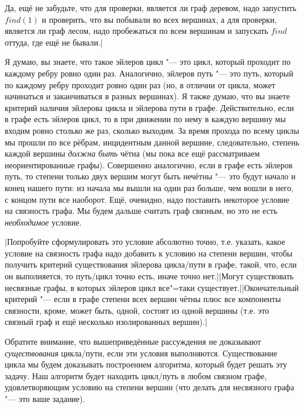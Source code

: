 Да, ещё не забудьте, что для проверки, является ли граф деревом, надо запустить $find(1)$ и проверить, что вы побывали
во всех вершинах, а для проверки, является ли граф лесом, надо пробежаться по всем вершинам и запускать $find$
оттуда, где ещё не бывали.|\label{checkiftree}

Я думаю, вы знаете, что такое эйлеров цикл "--- это цикл, который проходит по каждому ребру ровно 
один раз. Аналогично, эйлеров путь "--- это путь, который по каждому ребру проходит ровно один раз 
(но, в отличии от цикла, может начинаться и заканчиваться в разных вершинах). Я также думаю, что вы 
знаете критерий наличия эйлерова цикла и эйлерова пути в графе. Действительно, если в графе есть 
эйлеров цикл, то в при движении по нему в каждую вершину мы входим ровно столько же раз, сколько 
выходим. За время прохода по всему циклы мы прошли по все рёбрам, инцидентным данной вершине, 
следовательно, степень каждой вершины \textit{должна быть} чётна (мы пока все ещё рассматриваем 
неориентированные графы). Совершенно аналогично, если в графе есть эйлеров путь, то степени только 
двух вершим могут быть нечётны "--- это будут начало и конец нашего пути: из начала мы вышли на 
один раз больше, чем вошли в него, с концом пути все наоборот. Ещё, очевидно, надо поставить некоторое 
условие на связность графа. Мы будем дальше считать граф связным, но это не есть 
\textit{необходимое} условие.

\task|Попробуйте сформулировать это условие абсолютно точно, т.е. указать, какое условие на 
связность графа надо добавить к условию на степени вершин, чтобы получить критерий существования 
эйлерова цикла/пути в графе, такой, что, если он выполняется, то путь/цикл точно есть, иначе точно 
нет.||Могут существовать несвязные графы, в которых эйлеров цикл все"=таки существует.||Окончательный критерий "--- если 
в графе степени всех вершин чётны плюс все компоненты связности,
кроме, может быть, одной, состоят из одной вершины (т.е. это связный граф и ещё несколько изолированных вершин).|\label{Eulercriteria}

Обратите внимание, что вышеприведённые рассуждения не доказывают \textit{существования} цикла/пути, 
если эти условия выполняются. Существование цикла мы будем доказывать построением алгоритма, 
который будет решать эту задачу. Наш алгоритм будет находить цикл/путь в любом связном графе, 
удовлетворяющим условию на степени вершин (что делать для несвязного графа "--- это ваше задание).

